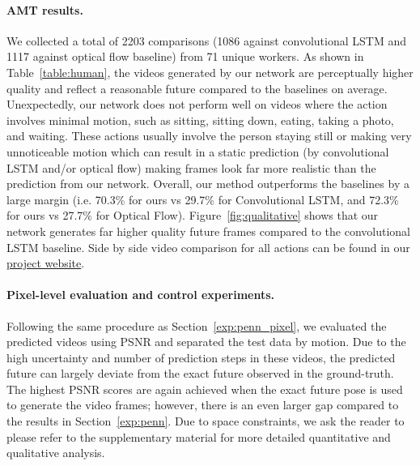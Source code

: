 \documentclass{article}
\begin{document}
\vspace{-8pt}\paragraph{AMT results.}
We collected a total of 2203 comparisons (1086 against convolutional LSTM and 1117 against optical flow baseline) from 71 unique workers.
As shown in Table~\ref{table:human}, the videos generated by our network are perceptually higher quality and reflect a reasonable future compared to the baselines on average.
Unexpectedly, our network does not perform well on videos where the action involves minimal motion,  such as sitting,  sitting down, eating, taking a photo, and waiting.
These actions usually involve the person staying still or making very unnoticeable motion which can result in a static prediction (by convolutional LSTM and/or optical flow) making frames look far more realistic than the prediction from our network.
Overall, our method outperforms the baselines by a large margin (i.e. 70.3\% for ours vs 29.7\% for Convolutional LSTM, and 72.3\% for ours vs 27.7\% for Optical Flow).
Figure~\ref{fig:qualitative} shows that our network generates far higher quality future frames compared to the convolutional LSTM baseline.
Side by side video comparison for all actions can be found in our \href{https://goo.gl/U7UOfy}{project website}.

\vspace{-8pt}\paragraph{Pixel-level evaluation and control experiments.}\label{exp:h36m_pixel}
Following the same procedure as Section~\ref{exp:penn_pixel}, we evaluated the predicted videos using PSNR and separated the test data by motion.
Due to the high uncertainty and number of prediction steps in these videos, the predicted future can largely deviate from the exact future observed in the ground-truth.
The highest PSNR scores are again achieved when the exact future pose is used to generate the video frames; however, there is an even larger gap compared to the results in Section~\ref{exp:penn}.
Due to space constraints, we ask the reader to please refer to the supplementary material for more detailed quantitative and qualitative analysis.
\end{document}
